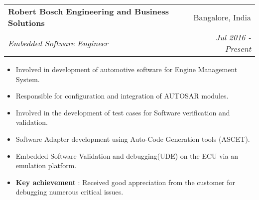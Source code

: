 \documentclass[letterpaper,11pt]{article}
\makeatletter
\newcommand{\resumeSubheading}[4]{
  \vspace{-1pt}\item
    \begin{tabular*}{0.97\textwidth}{l@{\extracolsep{\fill}}r}
      \textbf{#1} & #2 \\
      \textit{\small#3} & \textit{\small #4} \\
    \end{tabular*}\vspace{-5pt}
}
\newcommand{\resumeItemListStart}{\begin{itemize}}
\newcommand{\resumeItemListEnd}{\end{itemize}\vspace{-5pt}}
\makeatother
\begin{document}
    \resumeSubheading
      {Robert Bosch Engineering and Business Solutions}{Bangalore, India}
      {Embedded Software Engineer}{Jul 2016 - Present}
      \resumeItemListStart
        \item\small{Involved in development of automotive software for Engine Management System.\vspace{-2pt}}
        \item\small{Responsible for configuration and integration of AUTOSAR modules. \vspace{-2pt}}
		\iffalse
        \item\small{Responsible for customer requirements analysis for AUTOSAR adapter. \vspace{-2pt}}
		\item\small{Coordination of System \& SW requirements between customer project and customer platform. \vspace{-2pt}}
		\item\small{Carrying out System \& SW implementation review with function development. \vspace{-2pt}} 
        \fi
        \item\small{Involved in the development of test cases for Software verification and validation.}
		\item\small{Software Adapter development using Auto-Code Generation tools (ASCET).\vspace{-2pt}}
		\item\small{Embedded Software Validation and debugging(UDE) on the ECU via an emulation platform.\vspace{-2pt}}
		\item\small{\textbf{Key achievement} : Received good appreciation from the customer for debugging numerous critical issues.}
		
      \resumeItemListEnd
\end{document}
